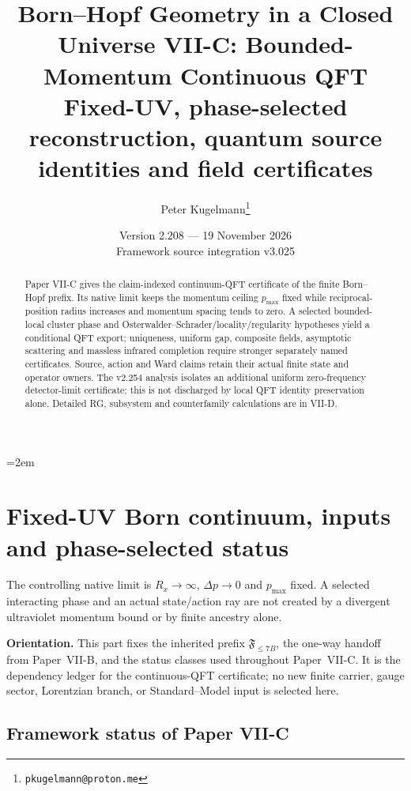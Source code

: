 \documentclass[12pt,a4paper]{article}
\title{\textbf{Born--Hopf Geometry in a Closed Universe VII-C: Bounded-Momentum Continuous QFT}\\[0.4em]
\large Fixed-UV, phase-selected reconstruction, quantum source identities and field certificates}
\author{Peter Kugelmann\thanks{\texttt{pkugelmann@proton.me}}}
\date{Version 2.208 --- 19 November 2026 \\ Framework source integration v3.025}
\begin{document}
\emergencystretch=2em
\maketitle
\begin{abstract}
Paper VII-C gives the claim-indexed continuum-QFT certificate of the
 finite Born--Hopf prefix. Its native limit keeps the momentum ceiling
 $p_{\max}$ fixed while reciprocal-position radius increases and momentum
 spacing tends to zero. A selected bounded-local cluster phase and
 Osterwalder--Schrader/locality/regularity hypotheses yield a conditional QFT
 export; uniqueness, uniform gap, composite fields, asymptotic scattering and
 massless infrared completion require stronger separately named certificates.
 Source, action and Ward claims retain their actual finite state and operator
 owners. The v2.254 analysis isolates an additional uniform zero-frequency detector-limit certificate; this is not discharged by local QFT identity preservation alone. Detailed RG, subsystem and counterfamily calculations are in VII-D.
\end{abstract}
\tableofcontents
\listoftables
\clearpage

\section{Fixed-UV Born continuum, inputs and phase-selected status}
\label{p12:sec:v237-c1}
The controlling native limit is $R_x\to\infty$, $\Delta p\to0$ and $p_{\max}$ fixed. A selected interacting phase and an actual state/action ray are not created by a divergent ultraviolet momentum bound or by finite ancestry alone.


\noindent\textbf{Orientation.}
This part fixes the inherited prefix \(\mathfrak F_{\le7B}\), the one-way handoff from Paper~VII-B, and the status classes used throughout Paper~VII-C.  It is the dependency ledger for the continuous-QFT certificate; no new finite carrier, gauge sector, Lorentzian branch, or Standard--Model input is selected here.


\subsection{Framework status of Paper VII-C}
\label{p12:sec:scope}
\end{document}
